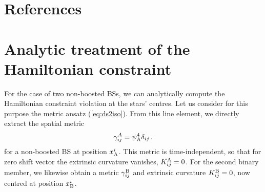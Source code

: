 \documentclass[11pt]{report}  %
\begin{document}
\section*{References}
%



\appendix

\section{Analytic treatment of the Hamiltonian constraint}
\label{sec:hamanalytic}
For the case of two non-boosted BSs, we can analytically
compute the Hamiltonian constraint violation
at the stars' centres. Let us consider for this purpose
the metric ansatz (\ref{eq:ds2iso}). From this line
element, we directly extract the spatial metric
%
%
\begin{equation}
    \gamma_{ij}^{A} = \psi_{\rm A}^4 \delta_{ij}\,.\label{eqn:appendixansatzmetric}
\end{equation}
%
for a non-boosted BS at position $x_{\rm A}^i$.
This metric is time-independent,
so that for zero shift vector the extrinsic curvature vanishes,
%
$K_{ij}^{\rm A} = 0$. 
%
For the second binary member, we likewise obtain a
metric $\gamma^{\rm B}_{ij}$ and extrinsic curvature
$K^{\rm B}_{ij}=0$, now centred at position $x_{\rm B}^i$.
\end{document}
